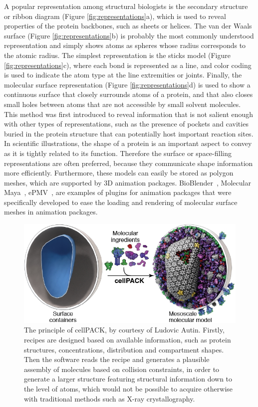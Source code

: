 A popular representation among structural biologists is the secondary structure or ribbon diagram (Figure \ref{fig:representations}a), which is used to reveal properties of the protein backbones, such as sheets or helices.
The van der Waals surface (Figure \ref{fig:representations}b) is probably the most commonly understood representation and simply shows atoms as spheres whose radius corresponds to the atomic radius.
The simplest representation is the sticks model (Figure \ref{fig:representations}c), where each bond is represented as a line, and color coding is used to indicate the atom type at the line extremities or joints.
Finally, the molecular surface representation (Figure \ref{fig:representations}d) is used to show a continuous surface that closely surrounds atoms of a protein, and that also closes small holes between atoms that are not accessible by small solvent molecules.
This method was first introduced to reveal information that is not salient enough with other types of representations, such as the presence of pockets and cavities buried in the protein structure that can potentially host important reaction sites.
In scientific illustrations, the shape of a protein is an important aspect to convey as it is tightly related to its function.
Therefore the surface or space-filling representations are often preferred, because they communicate shape information more efficiently.
Furthermore, these models can easily be stored as polygon meshes, which are supported by 3D animation packages.
BioBlender~\cite{andrei2012intuitive}, Molecular Maya~\cite{mmaya}, ePMV~\cite{johnson2011epmv}, are examples of plugins for animation packages that were specifically developed to ease the loading and rendering of molecular surface meshes in animation packages.

\begin{figure}
	\centering
	\includegraphics[width=0.85\linewidth]{graphics/cellpack_1}
	\caption{The principle of cellPACK, by courtesy of Ludovic Autin. Firstly, recipes are designed based on available information, such as protein structures, concentrations, distribution and compartment shapes. Then the software reads the recipe and generates a plausible assembly of molecules based on collision constraints, in order to generate a larger structure featuring structural information down to the level of atoms, which would not be possible to acquire otherwise with traditional methods such as X-ray crystallography.}
	\label{fig:cellpack}
\end{figure}

